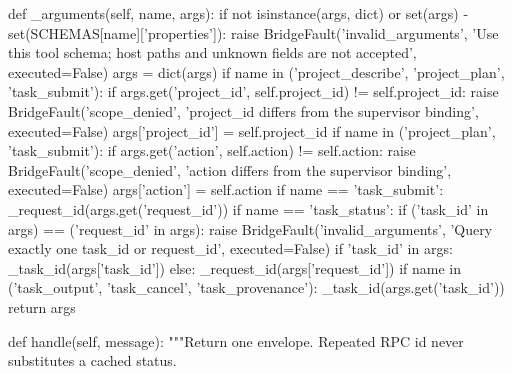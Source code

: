     def _arguments(self, name, args):
        if not isinstance(args, dict) or set(args) - set(SCHEMAS[name]['properties']):
            raise BridgeFault('invalid_arguments', 'Use this tool schema; host paths and unknown fields are not accepted', executed=False)
        args = dict(args)
        if name in ('project_describe', 'project_plan', 'task_submit'):
            if args.get('project_id', self.project_id) != self.project_id:
                raise BridgeFault('scope_denied', 'project_id differs from the supervisor binding', executed=False)
            args['project_id'] = self.project_id
        if name in ('project_plan', 'task_submit'):
            if args.get('action', self.action) != self.action:
                raise BridgeFault('scope_denied', 'action differs from the supervisor binding', executed=False)
            args['action'] = self.action
        if name == 'task_submit':
            _request_id(args.get('request_id'))
        if name == 'task_status':
            if ('task_id' in args) == ('request_id' in args):
                raise BridgeFault('invalid_arguments', 'Query exactly one task_id or request_id', executed=False)
            if 'task_id' in args: _task_id(args['task_id'])
            else: _request_id(args['request_id'])
        if name in ('task_output', 'task_cancel', 'task_provenance'):
            _task_id(args.get('task_id'))
        return args

    def handle(self, message):
        """Return one envelope. Repeated RPC id never substitutes a cached status.

